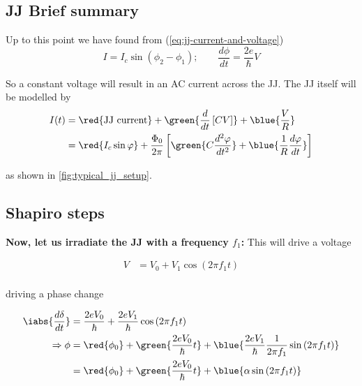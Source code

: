    \subsection{JJ Brief summary}
   \label{sec:jj-brief-summary}

\begin{framed}\noindent
  Up      to     this      point     we      have     found      from
  (\autoref{eq:jj-current-and-voltage})
  \begin{equation}
    I = I_c\sin(\phi_2-\phi_1); \qquad \frac{d\phi}{dt} = \frac{2e}{\hbar}V
  \end{equation}

  \noindent So a constant voltage will result in an AC current across
  the JJ. The JJ itself will be modelled by
  \begin{equation}\label{eq:jj-total-current}
    \begin{aligned}
      I(t) & = \red{\text{JJ current}} + \green{\frac{d}{dt}\left[ CV \right]} + \blue{\frac{V}{R}}\\
      & = \red{I_c\sin\varphi} + \frac{\Phi_{0}}{2\pi}\left[ \green{C
          \frac{d^2\varphi}{dt^{2}}}                                +
        \blue{\frac{1}{R}\frac{d\varphi}{dt}} \right]
    \end{aligned}
  \end{equation}

  \noindent as shown in \autoref{fig:typical_jj_setup}.
\end{framed}

\subsection{Shapiro steps}
\label{sec:shapiro-steps}

\textbf{Now, let  us irradiate the  JJ with a frequency  $f_1$:} This
will drive a voltage

\begin{equation}
  \begin{aligned}
    V & = V_0 + V_1\cos\left(2\pi f_1 t  \right)\\
  \end{aligned}
\end{equation}

\noindent driving a phase change

\begin{equation}
  \begin{aligned}
    \iabs{\frac{d\delta}{dt}} & = \frac{2eV_0}{\hbar} +
    \frac{2eV_{1}}{\hbar}\cos\left(  2\pi f_1  t \right)  \\
    \Rightarrow \phi &  = \red{\phi_0} + \green{\frac{2eV_0}{\hbar}t}
    + \blue{\frac{2eV_{1}}{\hbar}\frac{1}{2\pi
        f_{1}}\sin\left( 2\pi f_1 t \right)} \\
    & = \red{\phi_0} + \green{\frac{2eV_0}{\hbar}t} +
    \blue{\alpha\sin\left( 2\pi f_1 t \right)} \\
  \end{aligned}
\end{equation}


